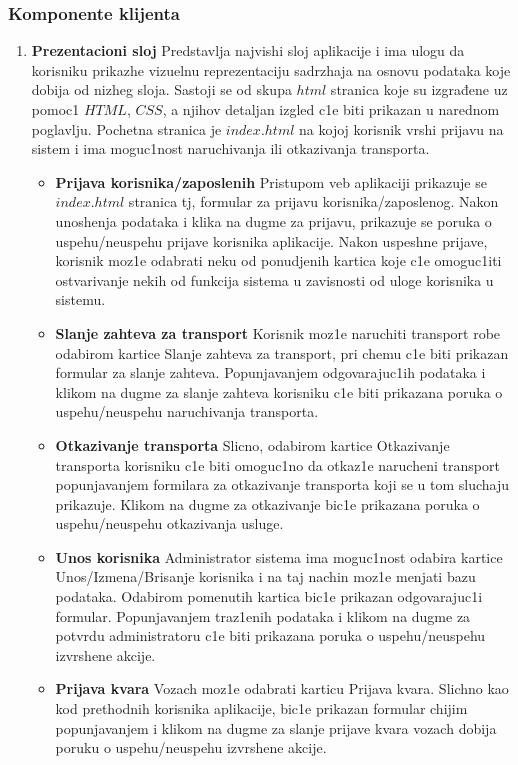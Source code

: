 \subsubsection{Komponente klijenta}
\begin{enumerate}
    \item \textbf{Prezentacioni sloj}
    Predstavlja najvishi sloj aplikacije i ima ulogu da korisniku
prikazhe vizuelnu reprezentaciju sadrzhaja na osnovu podataka koje dobija od nizheg
sloja. Sastoji se od skupa $html$ stranica koje su izgrađene uz pomoc1 $HTML$, $CSS$, a njihov detaljan izgled c1e biti prikazan u narednom poglavlju. Pochetna stranica je $index.html$ na kojoj korisnik vrshi prijavu na sistem i ima moguc1nost naruchivanja ili otkazivanja transporta. \\
\begin{itemize}
\item{\textbf{Prijava korisnika/zaposlenih}
Pristupom veb aplikaciji prikazuje se $index.html$ stranica tj, formular za prijavu korisnika/zaposlenog. Nakon unoshenja podataka i klika na dugme za prijavu, prikazuje se poruka o uspehu/neuspehu prijave korisnika aplikacije. Nakon uspeshne prijave, korisnik moz1e odabrati neku od ponudjenih kartica koje c1e omoguc1iti ostvarivanje nekih od funkcija sistema u zavisnosti od uloge korisnika u sistemu.}
\item{\textbf{Slanje zahteva za transport}
Korisnik moz1e naruchiti transport robe odabirom kartice Slanje zahteva za transport, pri chemu c1e biti prikazan formular za slanje zahteva. Popunjavanjem odgovarajuc1ih podataka i klikom na dugme za slanje zahteva korisniku c1e biti prikazana poruka o uspehu/neuspehu naruchivanja transporta.}
\item{\textbf{Otkazivanje transporta}
Slicno, odabirom kartice Otkazivanje transporta korisniku c1e biti omoguc1no da otkaz1e narucheni transport popunjavanjem formilara za otkazivanje transporta koji se u tom sluchaju prikazuje. Klikom na dugme za otkazivanje bic1e prikazana poruka o uspehu/neuspehu otkazivanja usluge.}
\item{\textbf{Unos korisnika}
Administrator sistema ima moguc1nost odabira kartice Unos/Izmena/Brisanje korisnika i na taj nachin moz1e menjati bazu podataka. Odabirom pomenutih kartica bic1e prikazan odgovarajuc1i formular. Popunjavanjem traz1enih podataka i klikom na dugme za potvrdu administratoru c1e biti prikazana poruka o uspehu/neuspehu izvrshene akcije.}
\item{\textbf{Prijava kvara}
Vozach moz1e odabrati karticu Prijava kvara. Slichno kao kod prethodnih korisnika aplikacije, bic1e prikazan formular chijim popunjavanjem i klikom na dugme za slanje prijave kvara vozach dobija poruku o uspehu/neuspehu izvrshene akcije.}


\end{itemize}
\end{enumerate}
